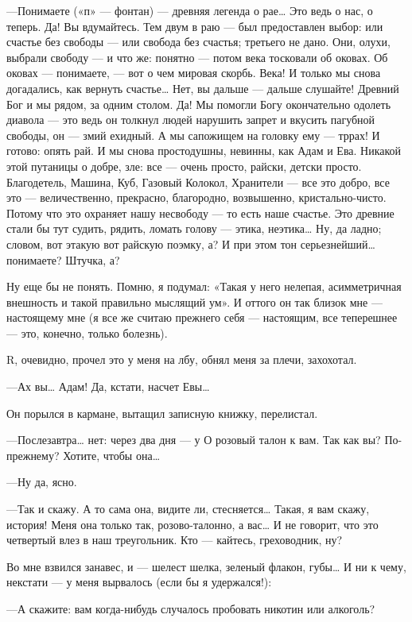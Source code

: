 \documentclass[11pt,openany]{book}
\begin{document}
---Понимаете («п» --- фонтан) --- древняя легенда о рае\ldots{} Это ведь о нас, о теперь. Да! Вы вдумайтесь. Тем двум в раю --- был предоставлен выбор: или счастье без свободы --- или свобода без счастья; третьего не дано. Они, олухи, выбрали свободу --- и что же: понятно --- потом века тосковали об оковах. Об оковах --- понимаете, --- вот о чем мировая скорбь. Века! И только мы снова догадались, как вернуть счастье\ldots{} Нет, вы дальше --- дальше слушайте! Древний Бог и мы рядом, за одним столом. Да! Мы помогли Богу окончательно одолеть диавола --- это ведь он толкнул людей нарушить запрет и вкусить пагубной свободы, он --- змий ехидный. А мы сапожищем на головку ему --- тррах! И готово: опять рай. И мы снова простодушны, невинны, как Адам и Ева. Никакой этой путаницы о добре, зле: все --- очень просто, райски, детски просто. Благодетель, Машина, Куб, Газовый Колокол, Хранители --- все это добро, все это --- величественно, прекрасно, благородно, возвышенно, кристально-чисто. Потому что это охраняет нашу несвободу --- то есть наше счастье. Это древние стали бы тут судить, рядить, ломать голову --- этика, неэтика\ldots{} Ну, да ладно; словом, вот этакую вот райскую поэмку, а? И при этом тон серьезнейший\ldots{} понимаете? Штучка, а?

Ну еще бы не понять. Помню, я подумал: «Такая у него нелепая, асимметричная внешность и такой правильно мыслящий ум». И оттого он так близок мне --- настоящему мне (я все же считаю прежнего себя --- настоящим, все теперешнее --- это, конечно, только болезнь).

R, очевидно, прочел это у меня на лбу, обнял меня за плечи, захохотал.

---Ах вы\ldots{} Адам! Да, кстати, насчет Евы\ldots{}

Он порылся в кармане, вытащил записную книжку, перелистал.

---Послезавтра\ldots{} нет: через два дня --- у О розовый талон к вам. Так как вы? По-прежнему? Хотите, чтобы она\ldots{}

---Ну да, ясно.

---Так и скажу. А то сама она, видите ли, стесняется\ldots{} Такая, я вам скажу, история! Меня она только так, розово-талонно, а вас\ldots{} И не говорит, что это четвертый влез в наш треугольник. Кто --- кайтесь, греховодник, ну?

Во мне взвился занавес, и --- шелест шелка, зеленый флакон, губы\ldots{} И ни к чему, некстати --- у меня вырвалось (если бы я удержался!):

---А скажите: вам когда-нибудь случалось пробовать никотин или алкоголь?
\end{document}
